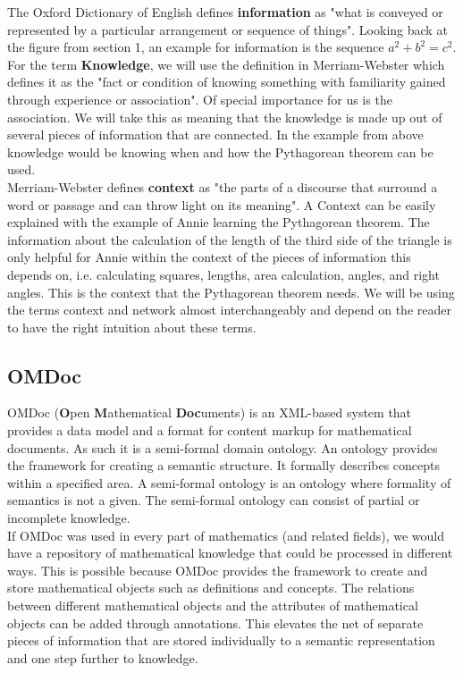 \documentclass[twoside]{article}
\begin{document}
The Oxford Dictionary of English \cite{OED:npentrel14} defines \textbf{information} as "what is conveyed or represented by a particular arrangement or sequence of things". Looking back at the figure from section 1, an example for information is the sequence \textit{$a^2 + b^2 = c^2$}. For the term \textbf{Knowledge}, we will use the definition in Merriam-Webster \cite{Webster:npentrel14} which defines it as the "fact or condition of knowing something with familiarity gained through experience or association". Of special importance for us is the association. We will take this as meaning that the knowledge is made up out of several pieces of information that are connected. In the example from above knowledge would be knowing when and how the Pythagorean theorem can be used.\\ 

Merriam-Webster \cite{Webster:npentrel14} defines \textbf{context} as "the parts of a discourse that surround a word or passage and can throw light on its meaning". A Context can be easily explained with the example of Annie learning the Pythagorean theorem. The information about the calculation of the length of the third side of the triangle is only helpful for Annie within the context of the pieces of information this depends on, i.e. calculating squares, lengths, area calculation, angles, and right angles. This is the context that the Pythagorean theorem needs. We will be using the terms context and network almost interchangeably and depend on the reader to have the right intuition about these terms.\\

\subsection{OMDoc}
\label{sec:OMDoc}

OMDoc (\textbf{O}pen \textbf{M}athematical \textbf{Doc}uments) \cite{Kohlhase:OMDoc1.2} is an XML-based system that provides a data model and a format for content markup for mathematical documents. As such it is a semi-formal domain ontology. An ontology provides the framework for creating a semantic structure. It formally describes concepts within a specified area. A semi-formal ontology \cite{Sheth:npentrel14} is an ontology where formality of semantics is not a given. The semi-formal ontology can consist of partial or incomplete knowledge. \\

If OMDoc was used in every part of mathematics (and related fields), we would have a repository of mathematical knowledge that could be processed in different ways. This is possible because OMDoc provides the framework to create and store mathematical objects such as definitions and concepts. The relations between different mathematical objects and the attributes of mathematical objects can be added through annotations. This elevates the net of separate pieces of information that are stored individually to a semantic representation and one step further to knowledge.\\
\end{document}
